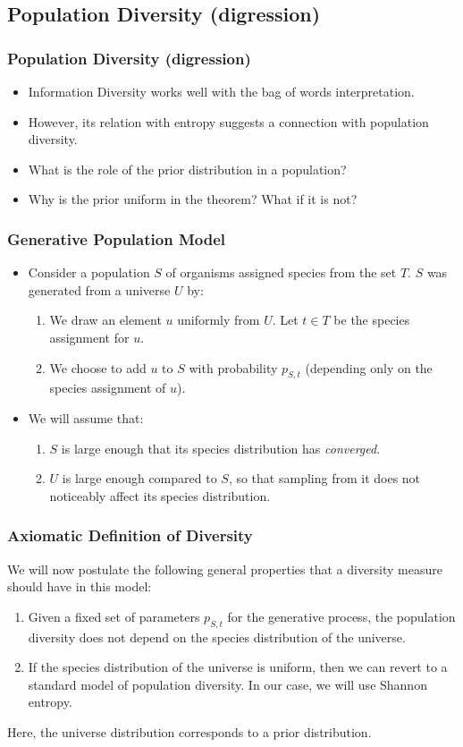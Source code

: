 \documentclass{beamer}
\begin{document}
\subsection{Population Diversity (digression)}

\begin{frame}
\frametitle{Population Diversity (digression)}
\begin{itemize}
\item Information Diversity works well with the bag of words
  interpretation. 
\item However, its relation with entropy suggests a
  connection with population diversity.
\item What is the role of the prior distribution in a population?
\item Why is the prior uniform in the theorem? What if it is not?
\end{itemize}
\end{frame}

\begin{frame}
\frametitle{Generative Population Model}
\begin{itemize}
\item Consider a population $S$ of
  organisms assigned species from the set $T$. $S$ was generated from a universe
  $U$ by:
\begin{enumerate}
\item We draw an element $u$ uniformly from $U$. Let $t\in
T$ be the species assignment for $u$.
\item We choose to add $u$ to
$S$ with probability $p_{S,t}$ (depending only on the species
assignment of $u$).
\end{enumerate}
\item We will assume that:
\begin{enumerate}
\item $S$ is large enough that its species
  distribution has {\em converged}.
\item $U$ is large enough compared to $S$, so that sampling from it
  does not noticeably affect its species distribution.
\end{enumerate}
\end{itemize}
\end{frame}

\begin{frame}
\frametitle{Axiomatic Definition of Diversity}
We will now postulate
the following general properties that a diversity measure
should have in this model:
\begin{enumerate}
\item Given a fixed set of parameters $p_{S,t}$ for the generative
  process, the population diversity does not depend on the species
  distribution of the universe.
\item If the species distribution of the universe is uniform, then we can
  revert to a standard model of population diversity. In our case, we
  will use Shannon entropy.
\end{enumerate}
Here, the universe distribution corresponds to a prior distribution.
\end{frame}
\end{document}

